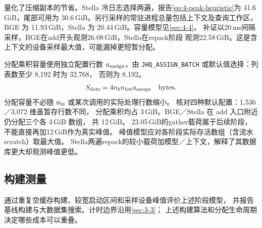 量化了压缩副本的节省。Stella 冷日志选择两遍，报告\cref{eq:4-peak-heuristic}为 41.6\,GiB，尾部可用为 30.6\,GiB。另行采样的常驻进程总量包括上下文及查询工作区，BGE 为 11.93\,GiB，Stella 为 20.44\,GiB。容量模型见\cref{sec:4-4}。
补证以20\,ms间隔采样，BGE在add开头观测26.08\,GiB，Stella在repack阶段
观测22.58\,GiB。这是含上下文的设备采样最大值，可能漏掉更短暂分配。

分配乘积容量使用独立配置行数 $a_{\rm assign}$，由
\texttt{JHQ\_ASSIGN\_BATCH} 或默认值选择：列表数至少 8,192 时为 32,768，
否则为 8,192。
\begin{equation}
 S_{\rm dots}=4n_b n_{\rm list}a_{\rm assign}\quad\text{bytes}.
 \label{eq:4-assignment-scratch}
\end{equation}
分配容量不必随 $a_{\rm in}$ 或某次调用的实际处理行数缩小。
核对四种默认配置：1,536／3,072 维虽暂存行数不同，
分配乘积均占 3\,GiB。BGE／Stella 在 add 入口附近仍分配三个各 4\,GiB 数组，
共 12\,GiB。
23.05\,GiB的gather载荷属于后续阶段，不能直接再加12\,GiB作为真实峰值。
峰值模型应对各阶段实际存活数组（含流水scratch）取最大值。
Stella两遍repack的较小载荷加模型／上下文，解释了其数据库更大却观测峰值更低。

\subsection{构建测量}

通过重复空缓存构建、较宽启动区间和采样设备峰值评价上述阶段模型，
并报告基线构建与大数据集搜索。计时边界沿用\cref{sec:3-3}；
上述构建算法和分配生命周期决定哪些成本可以重叠。

